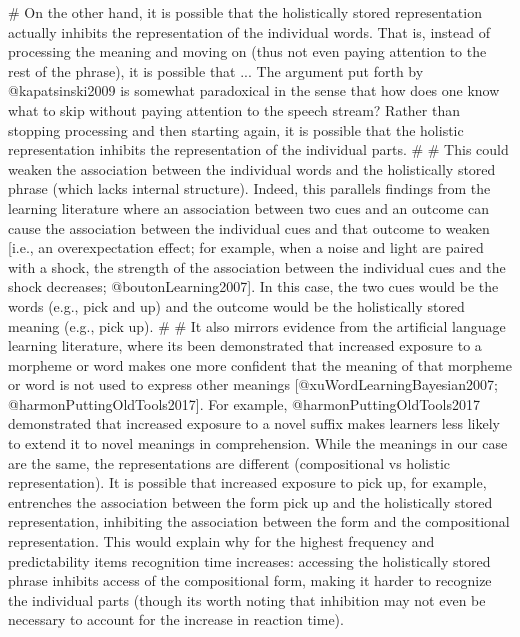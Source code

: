 \documentclass[
  authoryear,
  preprint,
  1p,
  onecolumn]{elsarticle}
\newenvironment{Shaded}{\begin{snugshade}}{\end{snugshade}}
\newcommand{\CommentTok}[1]{\textcolor[rgb]{0.37,0.37,0.37}{#1}}
\begin{document}
\begin{Shaded}
\begin{Highlighting}[]
\CommentTok{\# On the other hand, it is possible that the holistically stored representation actually inhibits the representation of the individual words. That is, instead of processing the meaning and moving on (thus not even paying attention to the rest of the phrase), it is possible that ... The argument put forth by @kapatsinski2009 is somewhat paradoxical in the sense that how does one know what to skip without paying attention to the speech stream? Rather than stopping processing and then starting again, it is possible that the holistic representation inhibits the representation of the individual parts.}
\CommentTok{\# }
\CommentTok{\# This could weaken the association between the individual words and the holistically stored phrase (which lacks internal structure). Indeed, this parallels findings from the learning literature where an association between two cues and an outcome can cause the association between the individual cues and that outcome to weaken [i.e., an overexpectation effect; for example, when a noise and light are paired with a shock, the strength of the association between the individual cues and the shock decreases; @boutonLearning2007]. In this case, the two cues would be the words (e.g., pick and up) and the outcome would be the holistically stored meaning (e.g., pick up).}
\CommentTok{\# }
\CommentTok{\# It also mirrors evidence from the artificial language learning literature, where it\textquotesingle{}s been demonstrated that increased exposure to a morpheme or word makes one more confident that the meaning of that morpheme or word is not used to express other meanings [@xuWordLearningBayesian2007; @harmonPuttingOldTools2017]. For example, @harmonPuttingOldTools2017 demonstrated that increased exposure to a novel suffix makes learners less likely to extend it to novel meanings in comprehension. While the meanings in our case are the same, the representations are different (compositional vs holistic representation). It is possible that increased exposure to pick up, for example, entrenches the association between the form pick up and the holistically stored representation, inhibiting the association between the form and the compositional representation. This would explain why for the highest frequency and predictability items recognition time increases: accessing the holistically stored phrase inhibits access of the compositional form, making it harder to recognize the individual parts (though it\textquotesingle{}s worth noting that inhibition may not even be necessary to account for the increase in reaction time).}
\end{Highlighting}
\end{Shaded}
\end{document}

